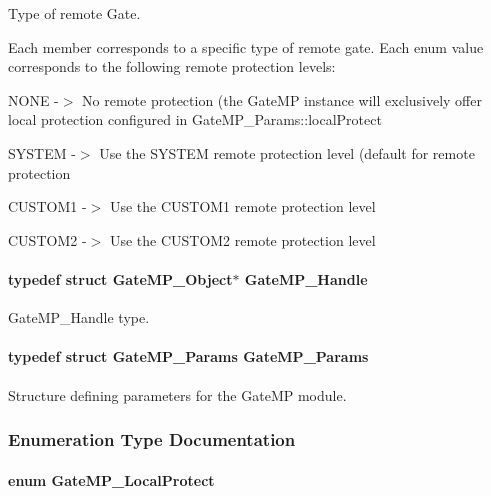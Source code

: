 Type of remote Gate. 

Each member corresponds to a specific type of remote gate. Each enum value corresponds to the following remote protection levels:
\begin{DoxyItemize}
\item NONE -\/$>$ No remote protection (the GateMP instance will exclusively offer local protection configured in GateMP\_\-Params::localProtect
\item SYSTEM -\/$>$ Use the SYSTEM remote protection level (default for remote protection
\item CUSTOM1 -\/$>$ Use the CUSTOM1 remote protection level
\item CUSTOM2 -\/$>$ Use the CUSTOM2 remote protection level 
\end{DoxyItemize}
\paragraph[{GateMP\_\-Handle}]{\setlength{\rightskip}{0pt plus 5cm}typedef struct GateMP\_\-Object$\ast$ {\bf GateMP\_\-Handle}}\hfill\label{_gate_m_p_8h_ad5bb259f928a14e98d973334bc60ebb3}


GateMP\_\-Handle type. 

\paragraph[{GateMP\_\-Params}]{\setlength{\rightskip}{0pt plus 5cm}typedef struct {\bf GateMP\_\-Params}  {\bf GateMP\_\-Params}}\hfill\label{_gate_m_p_8h_aa87249c5e69b88bfaa4ee817cacd3b42}


Structure defining parameters for the GateMP module. 



\subsubsection{Enumeration Type Documentation}
\paragraph[{GateMP\_\-LocalProtect}]{\setlength{\rightskip}{0pt plus 5cm}enum {\bf GateMP\_\-LocalProtect}}\hfill\label{_gate_m_p_8h_a3877bd64627d7449d3687e8b06939652}


